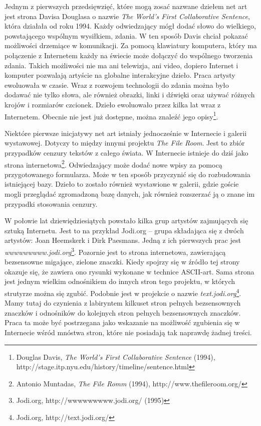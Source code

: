 \documentclass[a4paper,12pt,twoside]{article}
\begin{document}
Jednym z pierwszych przedsięwzięć,
które mogą zosać nazwane dziełem net art jest strona Davisa Douglasa
o nazwie \textit{The World's First Collaborative Sentence}, która działała
od roku 1994.
Każdy odwiedzający mógł dodać słowo do wielkiego,
powstającego wspólnym wysiłkiem, zdania. W ten sposób Davis chciał
pokazać możliwości drzemiące w komunikacji. Za pomocą klawiatury
komputera, który ma połączenie z Internetem każdy na świecie może
dołączyć do wspólnego tworzenia zdania. Takich możliwości nie ma
ani telewizja, ani video, dopiero Internet i komputer pozwalają artyście
na globalne interakcyjne dzieło. Praca artysty ewoluowała w czasie.
Wraz z rozwojem technologii do zdania można było dodawać nie tylko
słowa, ale również obrazki, linki i dźwięki oraz używać różnych krojów
i rozmiarów czcionek. Dzieło ewoluowało przez kilka lat wraz z Internetem.
Obecnie nie jest już dostępne, można znaleźć jego
opisy\footnote{ Douglas Davis, \textit{The World's First Collaborative
Sentence} (1994), http://stage.itp.nyu.edu/history/timeline/sentence.html}.

Niektóre pierwsze inicjatywy net art istniały jednocześnie w Internecie
i galerii wystawowej. Dotyczy to między innymi projektu
\textit{The File Room}. Jest to zbiór przypadków cenzury tekstów z całego
świata. W Internecie istnieje do dziś jako strona
internetowa\footnote{ Antonio Muntadas, \textit{The File Romm} (1994),
http://www.thefileroom.org/}. Odwiedzający
może dodać nowe wpisy za pomocą przygotowanego formularza. Może w ten sposób
przyczynić się do rozbudowania istniejącej bazy. Dzieło to zostało również
wystawione w galerii, gdzie goście mogli przeglądać zgromadzoną
bazę danych, jak również rozszerzać ją o znane im przypadki stosowania
cenzury.

W połowie lat dziewiędziesiątych powstało kilka grup artystów zajmujących
się sztuką Internetu. Jest to na przykład Jodi.org -- grupa
składająca się z dwóch artystów: Joan Heemskerk i Dirk Paesmans. Jedną
z ich pierwszych prac jest
\textit{wwwwwwwww.jodi.org}\footnote{ Jodi.org, http://wwwwwwwww.jodi.org/
(1995)}. Pozornie jest to strona internetowa, zawierającą bezsensowne
migające, zielone znaczki. Kiedy spojrzy się w źródło tej strony okazuje
się, że zawiera ono rysunki wykonane w technice ASCII-art. Sama strona
jest jednym wielkim odnośnikiem do innych stron tego projektu, w których
strutyrze można się zgubić. Podobnie jest w projekcie o nazwie
\textit{text.jodi.org}\footnote{ Jodi.org, http://text.jodi.org/}. Mamy tutaj
do czynienia z labiryntem kilkuset stron pełnych bezsensownych znaczków
i odnośników do kolejnych stron pełnych bezsensownych znaczków. Praca
ta może być postrzegana jako wskazanie na możliwość zgubienia się w Internecie
wśród mnóstwa stron, które nie posiadają tak naprawdę żadnej treści.
\end{document}
